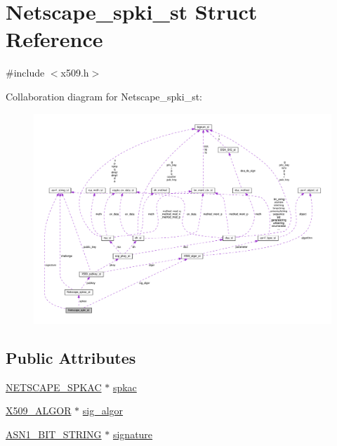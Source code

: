 \hypertarget{struct_netscape__spki__st}{}\section{Netscape\+\_\+spki\+\_\+st Struct Reference}
\label{struct_netscape__spki__st}


{\ttfamily \#include $<$x509.\+h$>$}



Collaboration diagram for Netscape\+\_\+spki\+\_\+st\+:
\nopagebreak
\begin{figure}[H]
\begin{center}
\leavevmode
\includegraphics[width=350pt]{struct_netscape__spki__st__coll__graph}
\end{center}
\end{figure}
\subsection*{Public Attributes}
\begin{DoxyCompactItemize}
\item 
\hyperlink{x509_8h_a490e724bcf7062dddfcbab65a4f452e9}{N\+E\+T\+S\+C\+A\+P\+E\+\_\+\+S\+P\+K\+AC} $\ast$ \hyperlink{struct_netscape__spki__st_a724664bfc3a3f03a4f8238be98807283}{spkac}
\item 
\hyperlink{ossl__typ_8h_aa2b6185e6254f36f709cd6577fb5022e}{X509\+\_\+\+A\+L\+G\+OR} $\ast$ \hyperlink{struct_netscape__spki__st_a490105a4ef783d32f79fd00f72f8aa62}{sig\+\_\+algor}
\item 
\hyperlink{ossl__typ_8h_af837aaa00e151b1e8773aea5a8fe1cc4}{A\+S\+N1\+\_\+\+B\+I\+T\+\_\+\+S\+T\+R\+I\+NG} $\ast$ \hyperlink{struct_netscape__spki__st_a8fe9d3a3731234862a6ea254e206140e}{signature}
\end{DoxyCompactItemize}


